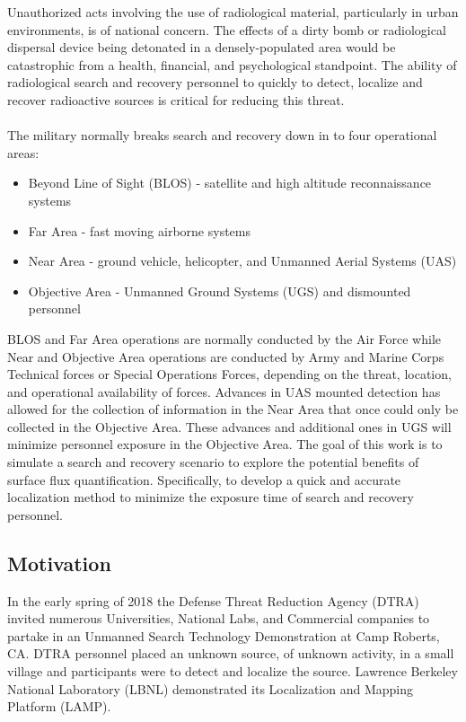 \noindent Unauthorized acts involving the use of radiological material, particularly in urban environments, is of national concern. The effects of a dirty bomb or radiological dispersal device being detonated in a densely-populated area would be catastrophic from a health, financial, and psychological standpoint. The ability of radiological search and recovery personnel to quickly to detect, localize and recover radioactive sources is critical for reducing this threat.
\\\\
The military normally breaks search and recovery down in to four operational areas:
\begin{itemize}
  \item Beyond Line of Sight (BLOS) - satellite and high altitude reconnaissance systems
  \item Far Area - fast moving airborne systems
  \item Near Area - ground vehicle, helicopter, and Unmanned Aerial Systems (UAS)
  \item Objective Area - Unmanned Ground Systems (UGS) and dismounted personnel
\end{itemize}
BLOS and Far Area operations are normally conducted by the Air Force while Near and Objective Area operations are conducted by Army and Marine Corps Technical forces or Special Operations Forces, depending on the threat, location, and operational availability of forces. Advances in UAS mounted detection has allowed for the collection of information in the Near Area that once could only be collected in the Objective Area. These advances and additional ones in UGS will minimize personnel exposure in the Objective Area. The goal of this work is to simulate a search and recovery scenario to explore the potential benefits of surface flux quantification. Specifically, to develop a quick and accurate localization method to minimize the exposure time of search and recovery personnel.

\subsection{Motivation}
\noindent In the early spring of 2018 the Defense Threat Reduction Agency (DTRA) invited numerous Universities, National Labs, and Commercial companies to partake in an Unmanned Search Technology Demonstration at Camp Roberts, CA. DTRA personnel placed an unknown source, of unknown activity, in a small village and participants were to detect and localize the source. Lawrence Berkeley National Laboratory (LBNL) demonstrated its Localization and Mapping Platform (LAMP).

